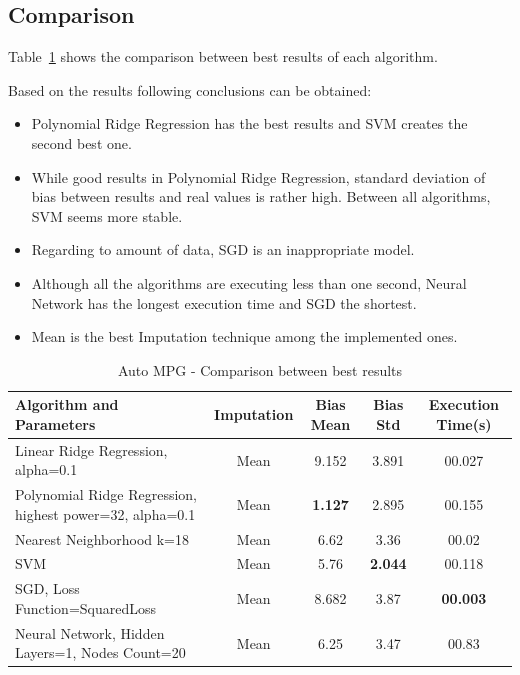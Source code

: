 \subsection{Comparison}
Table~\ref{table:db1-results} shows the comparison between best results of each algorithm.

Based on the results following conclusions can be obtained:
\begin{itemize}
  \item Polynomial Ridge Regression has the best results and SVM creates the second best one.
  \item While good results in Polynomial Ridge Regression, standard deviation of bias between results and real values is rather high. Between all algorithms, SVM seems more stable.
  \item Regarding to amount of data, SGD is an inappropriate model.
  \item Although all the algorithms are executing less than one second, Neural Network has the longest execution time and SGD the shortest.
  \item Mean is the best Imputation technique among the implemented ones.
\end{itemize}

		\begin{table}
\begin{center}
\begin{tabular}{|p{4cm}|c|c|c|c|}
\hline Algorithm and Parameters & Imputation & Bias Mean & Bias Std & Execution Time(s)\\

\hline Linear Ridge Regression, alpha=0.1 & Mean & 9.152 & 3.891 & 00.027 \\

\hline Polynomial Ridge Regression, highest power=32, alpha=0.1 & Mean & \textbf{1.127} & 2.895 & 00.155  \\

\hline Nearest Neighborhood k=18 & Mean & 6.62 & 3.36 & 00.02  \\

\hline SVM & Mean & 5.76 & \textbf{2.044} & 00.118  \\

\hline SGD, Loss Function=SquaredLoss & Mean & 8.682 & 3.87 & \textbf{00.003}  \\

\hline Neural Network, Hidden Layers=1, Nodes Count=20 & Mean & 6.25 & 3.47 & 00.83  \\

\hline
\end{tabular}
    \caption{Auto MPG - Comparison between best results}
    \label{table:db1-results}
\end{center}
    \end{table}


